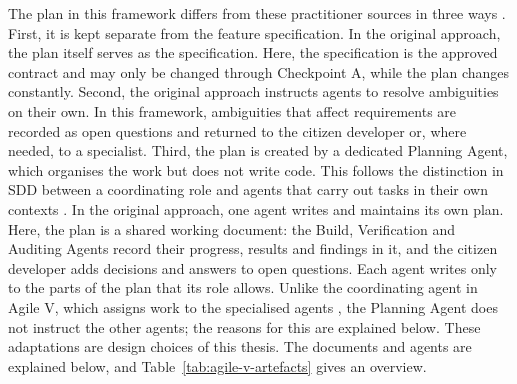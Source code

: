 \documentclass[10pt,a4paper]{article}
\begin{document}
The plan in this framework differs from these practitioner sources in three ways \parencite{lopopolo2026HarnessEngineering,friel2025}. First, it is kept separate from the feature specification. In the original approach, the plan itself serves as the specification. Here, the specification is the approved contract and may only be changed through Checkpoint A, while the plan changes constantly. Second, the original approach instructs agents to resolve ambiguities on their own. In this framework, ambiguities that affect requirements are recorded as open questions and returned to the citizen developer or, where needed, to a specialist. Third, the plan is created by a dedicated Planning Agent, which organises the work but does not write code. This follows the distinction in SDD between a coordinating role and agents that carry out tasks in their own contexts \parencite{diaz2026}. In the original approach, one agent writes and maintains its own plan. Here, the plan is a shared working document: the Build, Verification and Auditing Agents record their progress, results and findings in it, and the citizen developer adds decisions and answers to open questions. Each agent writes only to the parts of the plan that its role allows. Unlike the coordinating agent in Agile V, which assigns work to the specialised agents \parencite{koch2026agile}, the Planning Agent does not instruct the other agents; the reasons for this are explained below. These adaptations are design choices of this thesis. The documents and agents are explained below, and Table~\ref{tab:agile-v-artefacts} gives an overview.
\end{document}
